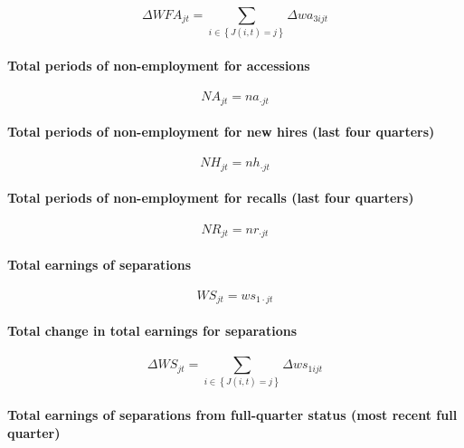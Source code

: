 \begin{equation}
\Delta WFA_{jt} = \sum\limits_{i \in \left\{ {J(i,t) = j} \right\}} {\Delta
wa_{3ijt} }
\end{equation}

\paragraph{Total periods of non-employment for accessions}

\begin{equation}
NA_{jt} = na_{\cdot jt}
\end{equation}

\paragraph{Total periods of non-employment for new hires (last four quarters)%
}

\begin{equation}
NH_{jt} = nh_{\cdot jt}
\end{equation}

\paragraph{Total periods of non-employment for recalls (last four quarters)}

\begin{equation}
NR_{jt} = nr_{\cdot jt}
\end{equation}

\paragraph{Total earnings of separations}

\begin{equation}
WS_{jt}=ws_{1\cdot jt}
\end{equation}

\paragraph{Total change in total earnings for separations}

\begin{equation}
\Delta WS_{jt} = \sum\limits_{i \in \left\{ {J(i,t) = j} \right\}} {\Delta
ws_{1ijt} }
\end{equation}

\paragraph{Total earnings of separations from full-quarter status (most
recent full quarter)}

